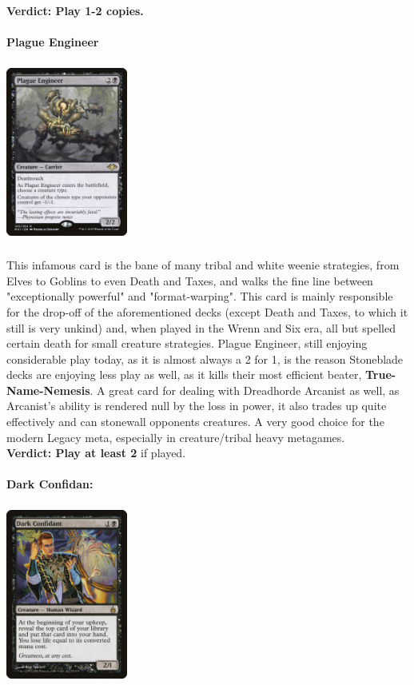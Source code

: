\documentclass{report}
\begin{document}
\textbf{Verdict: Play 1-2 copies.\\\\}
\textbf{Plague Engineer\\}
\begin{center}
\includegraphics [width = 4cm, height = 6cm] {plague-engineer}
\end{center}
This infamous card is the bane of many tribal and white weenie strategies, from Elves to Goblins to even Death and Taxes, and walks the fine line between "exceptionally powerful" and "format-warping". This card is mainly responsible for the drop-off of the aforementioned decks (except Death and Taxes, to which it still is very unkind) and, when played in the Wrenn and Six era, all but spelled certain death for small creature strategies. Plague Engineer, still enjoying considerable play today, as it is almost always a 2 for 1, is the reason Stoneblade decks are enjoying less play as well, as it kills their most efficient beater, \textbf{True-Name-Nemesis}. A great card for dealing with Dreadhorde Arcanist as well, as Arcanist's ability is rendered null by the loss in power, it also trades up quite effectively and can stonewall opponents creatures.
A very good choice for the modern Legacy meta, especially in creature/tribal heavy metagames.\\
\textbf{Verdict: Play at least 2} if played.\\\\
\textbf{Dark Confidan:\\}
\begin{center}
\includegraphics [width = 4cm, height = 6cm] {dark-confidant}
\end{center}
\end{document}
